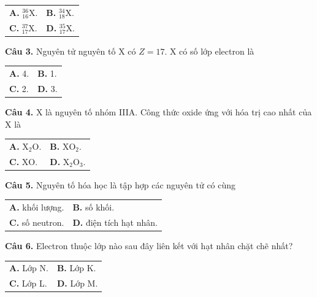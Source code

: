 \documentclass{article}
\begin{document}
\begin{tabularx}{\linewidth}{@{}X X@{}}
\textbf{A.} $_{16}^{36}\text{X}$. & \textbf{B.} $_{18}^{34}\text{X}$.\\[8pt]
\textbf{C.} $_{17}^{37}\text{X}$. & \textbf{D.} $_{17}^{35}\text{X}$.
\end{tabularx}
\vspace*{\fill}
\newpage

\fontsize{30}{39}\selectfont
\textbf{Câu 3.} Nguyên tử nguyên tố X có $Z = 17$. X có số lớp electron là
\vspace{8pt}

\begin{tabularx}{\linewidth}{@{}X X@{}}
\textbf{A.} 4. & \textbf{B.} 1.\\[8pt]
\textbf{C.} 2. & \textbf{D.} 3.
\end{tabularx}

\vspace*{\fill}

\textbf{Câu 4.} X là nguyên tố nhóm IIIA. Công thức oxide ứng với hóa trị cao nhất của X là
\vspace{8pt}

\begin{tabularx}{\linewidth}{@{}X X@{}}
\textbf{A.} $\text{X}_2\text{O}$. & \textbf{B.} $\text{XO}_2$.\\[8pt]
\textbf{C.} $\text{XO}$. & \textbf{D.} $\text{X}_2\text{O}_3$.
\end{tabularx}
\vspace*{\fill}
\newpage

\fontsize{30}{39}\selectfont
\textbf{Câu 5.} Nguyên tố hóa học là tập hợp các nguyên tử có cùng
\vspace{8pt}

\begin{tabularx}{\linewidth}{@{}X X@{}}
\textbf{A.} khối lượng. & \textbf{B.} số khối.\\[8pt]
\textbf{C.} số neutron. & \textbf{D.} điện tích hạt nhân.
\end{tabularx}

\vspace*{\fill}

\textbf{Câu 6.} Electron thuộc lớp nào sau đây liên kết với hạt nhân chặt chẽ nhất?
\vspace{8pt}

\begin{tabularx}{\linewidth}{@{}X X@{}}
\textbf{A.} Lớp N. & \textbf{B.} Lớp K.\\[8pt]
\textbf{C.} Lớp L. & \textbf{D.} Lớp M.
\end{tabularx}
\vspace*{\fill}
\newpage
\end{document}
